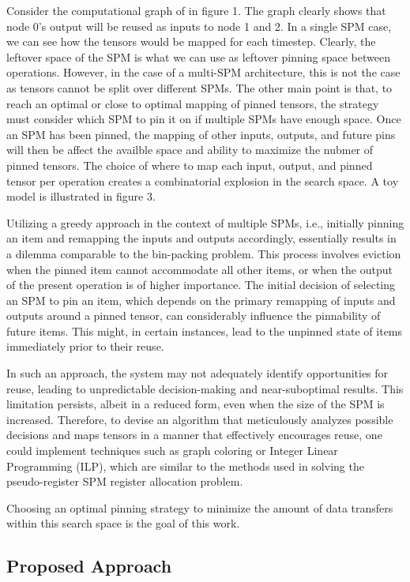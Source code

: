 Consider the computational graph of in figure 1. The graph clearly shows that
node 0's output will be reused as inputs to node 1 and 2. In a single SPM case,
we can see how the tensors would be mapped for each timestep. Clearly, the leftover
space of the SPM is what we can use as leftover pinning space between operations.
However, in the case of a multi-SPM architecture, this is not the case as tensors
cannot be split over different SPMs. The other main point is that, to reach an optimal
or close to optimal mapping of pinned tensors, the strategy must consider which SPM
to pin it on if multiple SPMs have enough space. Once an SPM has been pinned, the
mapping of other inputs, outputs, and future pins will then be affect the availble
space and ability to maximize the nubmer of pinned tensors. The choice of where to
map each input, output, and pinned tensor per operation creates a combinatorial
explosion in the search space. A toy model is illustrated in figure 3.

Utilizing a greedy approach in the context of multiple SPMs, i.e., initially
pinning an item and remapping the inputs and outputs accordingly, essentially
results in a dilemma comparable to the bin-packing problem. This process
involves eviction when the pinned item cannot accommodate all other items, or
when the output of the present operation is of higher importance. The initial
decision of selecting an SPM to pin an item, which depends on the primary
remapping of inputs and outputs around a pinned tensor, can considerably
influence the pinnability of future items. This might, in certain instances,
lead to the unpinned state of items immediately prior to their reuse.

In such an approach, the system may not adequately identify opportunities for
reuse, leading to unpredictable decision-making and near-suboptimal results.
This limitation persists, albeit in a reduced form, even when the size of the
SPM is increased. Therefore, to devise an algorithm that meticulously analyzes
possible decisions and maps tensors in a manner that effectively encourages
reuse, one could implement techniques such as graph coloring or Integer Linear
Programming (ILP), which are similar to the methods used in solving the
pseudo-register SPM register allocation problem.

Choosing an optimal pinning strategy to minimize the amount of data transfers
within this search space is the goal of this work.

\subsection{Proposed Approach}

